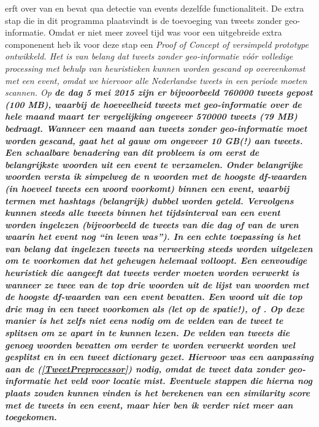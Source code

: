 {{ erft over van  en bevat qua detectie van 
events dezelfde functionaliteit. De extra stap die in dit programma plaatsvindt 
is de toevoeging van tweets zonder geo-informatie. Omdat er niet meer zoveel 
tijd was voor een uitgebreide extra componenent heb ik voor deze stap een \it{Proof 
of Concept} of versimpeld prototype ontwikkeld.
\vl
Het is van belang dat tweets zonder geo-informatie vóór volledige processing met 
behulp van \it{heuristieken} kunnen worden gescand op overeenkomst met een event, 
omdat we hiervoor \it{alle} Nederlandse tweets in een periode moeten scannen. Op \bf{de 
dag} 5 mei 2015 zijn er bijvoorbeeld 760000 tweets gepost (100 MB), waarbij de 
hoeveelheid tweets met geo-informatie over \bf{de hele maand} maart ter vergelijking ongeveer 570000 
tweets (79 MB) bedraagt. Wanneer een maand aan tweets zonder geo-informatie moet 
worden gescand, gaat het al gauw om ongeveer 10 GB(!) aan tweets.
\vl
Een schaalbare benadering van dit probleem is om eerst de belangrijkste woorden 
uit een event te verzamelen. Onder belangrijke woorden versta ik simpelweg de n 
woorden met de hoogste \it{df-waarden} (in hoeveel tweets een woord voorkomt) binnen 
een event, waarbij termen met hashtags (belangrijk) dubbel worden geteld. Vervolgens
kunnen steeds alle tweets binnen het tijdsinterval van een event worden ingelezen 
(bijvoorbeeld de tweets van die dag of van de uren waarin het event nog ``in leven
was''). In een echte toepassing is het van belang dat ingelezen tweets na 
verwerking steeds worden uitgelezen om te voorkomen dat het geheugen helemaal volloopt. 
\vl
Een eenvoudige heuristiek die aangeeft dat tweets verder moeten worden verwerkt 
is wanneer ze twee van de top drie woorden uit de lijst van woorden met de 
hoogste df-waarden van een event bevatten. Een woord uit die top drie mag in een 
tweet voorkomen als  (let op de spatie!),  of . Op deze 
manier is het zelfs niet eens nodig om de velden van de tweet te splitsen om ze 
apart in te kunnen lezen. De velden van tweets die genoeg woorden bevatten om 
verder te worden verwerkt worden wel gesplitst en in een tweet dictionary gezet. 
Hiervoor was een aanpassing aan de  (\ref{TweetPreprocessor}) nodig, omdat de 
tweet data zonder geo-informatie het veld voor locatie mist. Eventuele stappen 
die hierna nog plaats zouden kunnen vinden is het berekenen van een \it{similarity 
score} met de tweets in een event, maar hier ben ik verder niet meer aan 
toegekomen.

}}
